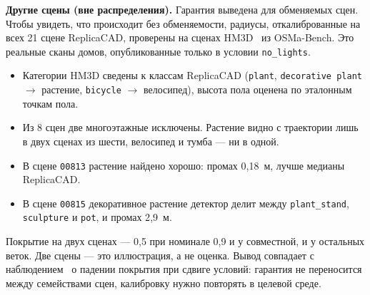 \textbf{Другие сцены (вне распределения).} Гарантия выведена для обменяемых сцен. Чтобы увидеть, что происходит без обменяемости, радиусы, откалиброванные на всех 21 сцене ReplicaCAD, проверены на сценах HM3D~\cite{hm3d} из OSMa-Bench. Это реальные сканы домов, опубликованные только в условии \texttt{no\_lights}.
\begin{itemize}[nosep]
  \item Категории HM3D сведены к классам ReplicaCAD (\texttt{plant}, \texttt{decorative plant} $\to$ растение, \texttt{bicycle} $\to$ велосипед), высота пола оценена по эталонным точкам пола.
  \item Из 8 сцен две многоэтажные исключены. Растение видно с траектории лишь в двух сценах из шести, велосипед и тумба --- ни в одной.
  \item В сцене \texttt{00813} растение найдено хорошо: промах 0{,}18~м, лучше медианы ReplicaCAD.
  \item В сцене \texttt{00815} декоративное растение детектор делит между \texttt{plant\_stand}, \texttt{sculpture} и \texttt{pot}, и промах 2{,}9~м.
\end{itemize}
Покрытие на двух сценах --- 0{,}5 при номинале 0{,}9 и у совместной, и у остальных веток. Две сцены --- это иллюстрация, а не оценка. Вывод совпадает с наблюдением~\cite{sundarsingh} о падении покрытия при сдвиге условий: гарантия не переносится между семействами сцен, калибровку нужно повторять в целевой среде.
